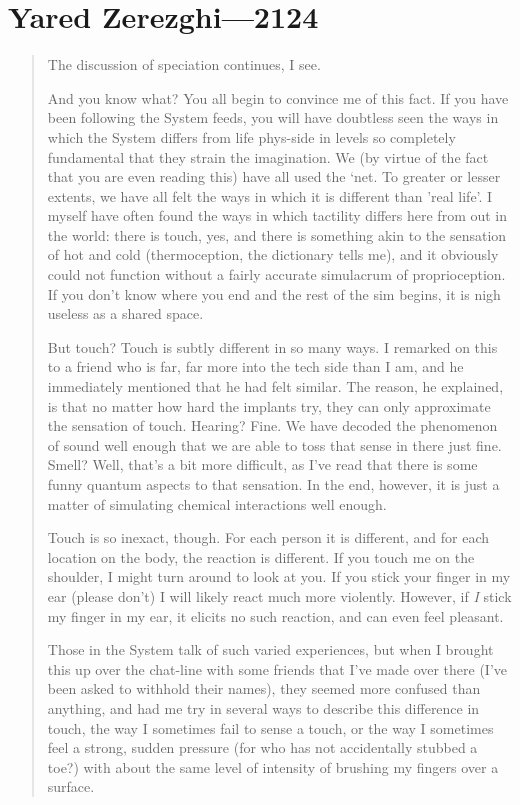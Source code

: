 \hypertarget{yared-zerezghi-2124}{%
\chapter{Yared Zerezghi---2124}\label{yared-zerezghi-2124}}

\begin{quote}
The discussion of speciation continues, I see.

And you know what? You all begin to convince me of this fact. If you have been following the System feeds, you will have doubtless seen the ways in which the System differs from life phys-side in levels so completely fundamental that they strain the imagination. We (by virtue of the fact that you are even reading this) have all used the `net. To greater or lesser extents, we have all felt the ways in which it is different than 'real life'. I myself have often found the ways in which tactility differs here from out in the world: there is touch, yes, and there is something akin to the sensation of hot and cold (thermoception, the dictionary tells me), and it obviously could not function without a fairly accurate simulacrum of proprioception. If you don't know where you end and the rest of the sim begins, it is nigh useless as a shared space.

But touch? Touch is subtly different in so many ways. I remarked on this to a friend who is far, far more into the tech side than I am, and he immediately mentioned that he had felt similar. The reason, he explained, is that no matter how hard the implants try, they can only approximate the sensation of touch. Hearing? Fine. We have decoded the phenomenon of sound well enough that we are able to toss that sense in there just fine. Smell? Well, that's a bit more difficult, as I've read that there is some funny quantum aspects to that sensation. In the end, however, it is just a matter of simulating chemical interactions well enough.

Touch is so inexact, though. For each person it is different, and for each location on the body, the reaction is different. If you touch me on the shoulder, I might turn around to look at you. If you stick your finger in my ear (please don't) I will likely react much more violently. However, if \emph{I} stick my finger in my ear, it elicits no such reaction, and can even feel pleasant.

Those in the System talk of such varied experiences, but when I brought this up over the chat-line with some friends that I've made over there (I've been asked to withhold their names), they seemed more confused than anything, and had me try in several ways to describe this difference in touch, the way I sometimes fail to sense a touch, or the way I sometimes feel a strong, sudden pressure (for who has not accidentally stubbed a toe?) with about the same level of intensity of brushing my fingers over a surface.


\end{quote}
